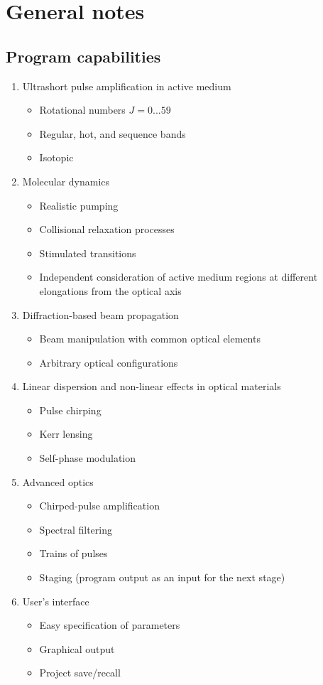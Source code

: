 \chapter{General notes}

\section{Program capabilities}
\begin{enumerate}
    \item Ultrashort pulse amplification in  active medium
    \begin{itemize}
        \item Rotational numbers \( J = 0...59 \)
        \item Regular, hot, and sequence bands
        \item Isotopic 
    \end{itemize}
    \item Molecular dynamics
    \begin{itemize}
        \item Realistic pumping
        \item Collisional relaxation processes
        \item Stimulated transitions
        \item Independent consideration of active medium regions at different elongations from the optical axis
    \end{itemize}
    \item Diffraction-based beam propagation
    \begin{itemize}
        \item Beam manipulation with common optical elements
        \item Arbitrary optical configurations
    \end{itemize}
    \item Linear dispersion and non-linear effects in optical materials
    \begin{itemize}
        \item Pulse chirping
        \item Kerr lensing
        \item Self-phase modulation
    \end{itemize}
    \item Advanced optics
    \begin{itemize}
        \item Chirped-pulse amplification
        \item Spectral filtering
        \item Trains of pulses
        \item Staging (program output as an input for the next stage)
    \end{itemize}
    \item User's interface
    \begin{itemize}
        \item Easy specification of parameters
        \item Graphical output
        \item Project save/recall
    \end{itemize}
\end{enumerate}


